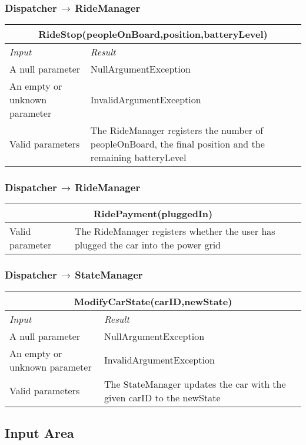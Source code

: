 \documentclass[11pt,a4paper]{report}
\begin{document}
\subsubsection{Dispatcher$\,\to\,$RideManager}
\begin{tabularx}{\textwidth}{|X|X|}
	\hline
	\multicolumn{2}{|c|}{\textbf{RideStop(peopleOnBoard,position,batteryLevel)}}\\
	\hline
	\textit{Input} & \textit{Result}\\
	\hline
	A null parameter & NullArgumentException\\
	\hline
	An empty or unknown parameter & InvalidArgumentException\\
	\hline
	Valid parameters & The RideManager registers the number of peopleOnBoard, the final position and the remaining batteryLevel\\
	\hline
\end{tabularx}
\subsubsection{Dispatcher$\,\to\,$RideManager}
\begin{tabularx}{\textwidth}{|X|X|}
	\hline
	\multicolumn{2}{|c|}{\textbf{RidePayment(pluggedIn)}}\\
	\hline
	Valid parameter & The RideManager registers whether the user has plugged the car into the power grid\\
	\hline
\end{tabularx}
\subsubsection{Dispatcher$\,\to\,$StateManager}
\begin{tabularx}{\textwidth}{|X|X|}
	\hline
	\multicolumn{2}{|c|}{\textbf{ModifyCarState(carID,newState)}}\\
	\hline
	\textit{Input} & \textit{Result}\\
	\hline
	A null parameter & NullArgumentException\\
	\hline
	An empty or unknown parameter & InvalidArgumentException\\
	\hline
	Valid parameters & The StateManager updates the car with the given carID to the newState\\
	\hline
\end{tabularx}
\subsection{Input Area}
\end{document}
